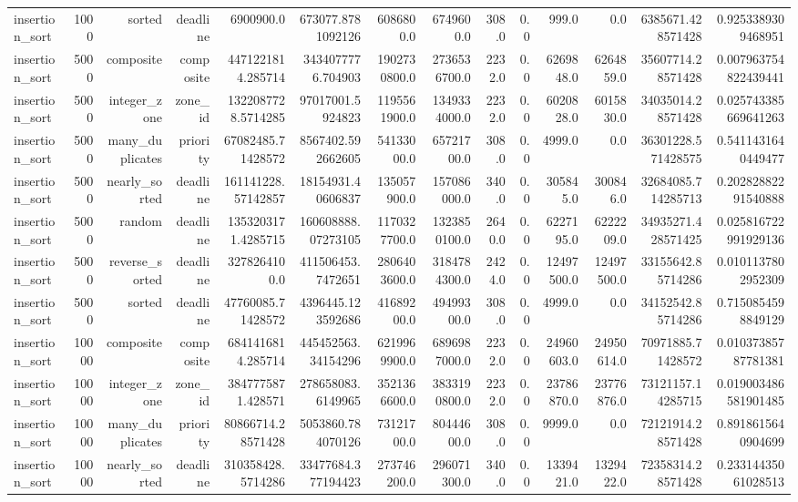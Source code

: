\begin{table}[htbp]
\begin{tabular}{lrrrrrrrrrrrrr}
insertion_sort & 1000 & sorted & deadline & 6900900.0 & 673077.8781092126 & 6086800.0 & 6749600.0 & 308.0 & 0.0 & 999.0 & 0.0 & 6385671.428571428 & 0.9253389309468951 \\
insertion_sort & 5000 & composite & composite & 4471221814.285714 & 3434077776.704903 & 1902730800.0 & 2736536700.0 & 2232.0 & 0.0 & 6269848.0 & 6264859.0 & 35607714.28571428 & 0.007963754822439441 \\
insertion_sort & 5000 & integer_zone & zone_id & 1322087728.5714285 & 97017001.5924823 & 1195561900.0 & 1349334000.0 & 2232.0 & 0.0 & 6020828.0 & 6015830.0 & 34035014.28571428 & 0.025743385669641263 \\
insertion_sort & 5000 & many_duplicates & priority & 67082485.71428572 & 8567402.592662605 & 54133000.0 & 65721700.0 & 308.0 & 0.0 & 4999.0 & 0.0 & 36301228.571428575 & 0.5411431640449477 \\
insertion_sort & 5000 & nearly_sorted & deadline & 161141228.57142857 & 18154931.40606837 & 135057900.0 & 157086000.0 & 340.0 & 0.0 & 305845.0 & 300846.0 & 32684085.714285713 & 0.20282882291540888 \\
insertion_sort & 5000 & random & deadline & 1353203171.4285715 & 160608888.07273105 & 1170327700.0 & 1323850100.0 & 2640.0 & 0.0 & 6227195.0 & 6222209.0 & 34935271.428571425 & 0.025816722991929136 \\
insertion_sort & 5000 & reverse_sorted & deadline & 3278264100.0 & 411506453.7472651 & 2806403600.0 & 3184784300.0 & 2424.0 & 0.0 & 12497500.0 & 12497500.0 & 33155642.85714286 & 0.0101137802952309 \\
insertion_sort & 5000 & sorted & deadline & 47760085.71428572 & 4396445.123592686 & 41689200.0 & 49499300.0 & 308.0 & 0.0 & 4999.0 & 0.0 & 34152542.85714286 & 0.7150854598849129 \\
insertion_sort & 10000 & composite & composite & 6841416814.285714 & 445452563.34154296 & 6219969900.0 & 6896987000.0 & 2232.0 & 0.0 & 24960603.0 & 24950614.0 & 70971885.71428572 & 0.01037385787781381 \\
insertion_sort & 10000 & integer_zone & zone_id & 3847775871.428571 & 278658083.6149965 & 3521366600.0 & 3833190800.0 & 2232.0 & 0.0 & 23786870.0 & 23776876.0 & 73121157.14285715 & 0.019003486581901485 \\
insertion_sort & 10000 & many_duplicates & priority & 80866714.28571428 & 5053860.784070126 & 73121700.0 & 80444600.0 & 308.0 & 0.0 & 9999.0 & 0.0 & 72121914.28571428 & 0.8918615640904699 \\
insertion_sort & 10000 & nearly_sorted & deadline & 310358428.5714286 & 33477684.377194423 & 273746200.0 & 296071300.0 & 340.0 & 0.0 & 1339421.0 & 1329422.0 & 72358314.28571428 & 0.23314435061028513 \\

\end{tabular}
\end{table}
